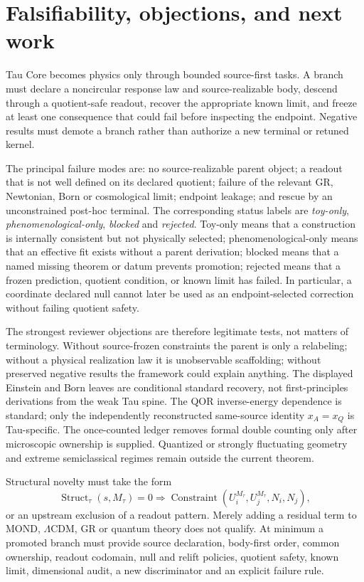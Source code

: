 \documentclass[11pt]{article}
\newcommand{\Mta}{M_{\tau}}
\begin{document}
\section{Falsifiability, objections, and next work}

Tau Core becomes physics only through bounded source-first tasks.  A branch
must declare a noncircular response law and source-realizable body, descend
through a quotient-safe readout, recover the appropriate known limit, and
freeze at least one consequence that could fail before inspecting the
endpoint.  Negative results must demote a branch rather than authorize a new
terminal or retuned kernel.

The principal failure modes are: no source-realizable parent object; a readout
that is not well defined on its declared quotient; failure of the relevant GR,
Newtonian, Born or cosmological limit; endpoint leakage; and rescue by an
unconstrained post-hoc terminal.  The corresponding status labels are
\emph{toy-only}, \emph{phenomenological-only}, \emph{blocked} and
\emph{rejected}.  Toy-only means that a construction is internally
consistent but not physically selected; phenomenological-only means that an
effective fit exists without a parent derivation; blocked means that a named
missing theorem or datum prevents promotion; rejected means that a frozen
prediction, quotient condition, or known limit has failed.  In particular, a
coordinate declared null cannot later be
used as an endpoint-selected correction without failing quotient safety.

The strongest reviewer objections are therefore legitimate tests, not matters
of terminology.  Without source-frozen constraints the parent is only a
relabeling; without a physical realization law it is unobservable scaffolding;
without preserved negative results the framework could explain anything.  The
displayed Einstein and Born leaves are conditional standard recovery, not
first-principles derivations from the weak Tau spine.  The QOR inverse-energy
dependence is standard; only the independently reconstructed same-source
identity \(x_A=x_Q\) is Tau-specific.  The once-counted ledger removes formal
double counting only after microscopic ownership is supplied.  Quantized or
strongly fluctuating geometry and extreme semiclassical regimes remain outside
the current theorem.

Structural novelty must take the form
\[
 \operatorname{Struct}_\tau(s,\Mta)=0
 \Longrightarrow
 \operatorname{Constraint}(U_i^{\Mta},U_j^{\Mta},N_i,N_j),
\]
or an upstream exclusion of a readout pattern.  Merely adding a residual term
to MOND, \(\Lambda\)CDM, GR or quantum theory does not qualify.  At minimum a
promoted branch must provide source declaration, body-first order, common
ownership, readout codomain, null and relift policies, quotient safety, known
limit, dimensional audit, a new discriminator and an explicit failure rule.
\end{document}
